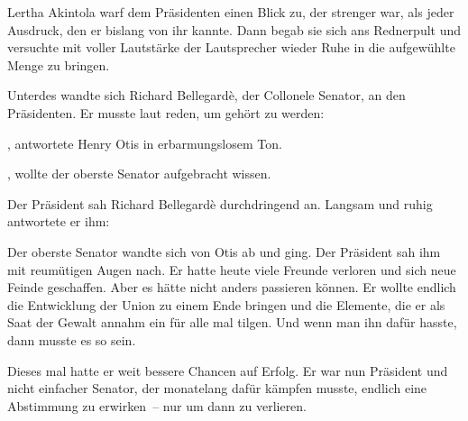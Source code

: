 Lertha Akintola warf dem Präsidenten einen Blick zu, der strenger war, als jeder Ausdruck, den er bislang von ihr kannte.
Dann begab sie sich ans Rednerpult und versuchte mit voller Lautstärke der Lautsprecher wieder Ruhe in die aufgewühlte Menge zu bringen.

\par

Unterdes wandte sich Richard Bellegardè, der Collonele Senator, an den Präsidenten.
Er musste laut reden, um gehört zu werden:

\par

, antwortete Henry Otis in erbarmungslosem Ton.

\par

, wollte der oberste Senator aufgebracht wissen.

\par

Der Präsident sah Richard Bellegardè durchdringend an.
Langsam und ruhig antwortete er ihm:

\par

Der oberste Senator wandte sich von Otis ab und ging.
Der Präsident sah ihm mit reumütigen Augen nach.
Er hatte heute viele Freunde verloren und sich neue Feinde geschaffen.
Aber es hätte nicht anders passieren können.
Er wollte endlich die Entwicklung der Union zu einem Ende bringen und die Elemente, die er als Saat der Gewalt annahm ein für alle mal tilgen.
Und wenn man ihn dafür hasste, dann musste es so sein.

\par

Dieses mal hatte er weit bessere Chancen auf Erfolg.
Er war nun Präsident und nicht einfacher Senator, der monatelang dafür kämpfen musste, endlich eine Abstimmung zu erwirken~-- nur um dann zu verlieren.

